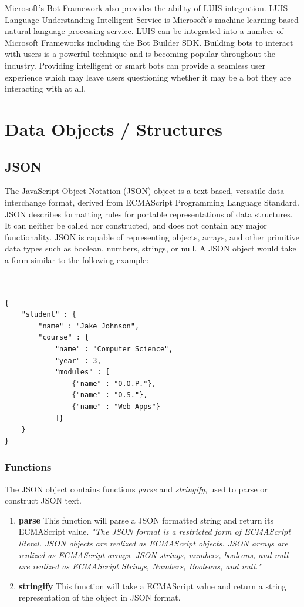 Microsoft's Bot Framework also provides the ability of LUIS\cite{LUIS} integration. LUIS - Language Understanding Intelligent Service is Microsoft's machine learning based natural language processing service. LUIS can be integrated into a number of Microsoft Frameworks including the Bot Builder SDK. Building bots to interact with users is a powerful technique and is becoming popular throughout the industry. Providing intelligent or smart bots can provide a seamless user experience which may leave users questioning whether it may be a bot they are interacting with at all.

\section{Data Objects / Structures}
\subsection{JSON}
	The JavaScript Object Notation (JSON) object is a text-based, versatile data interchange format, derived from ECMAScript Programming Language Standard. JSON describes formatting rules for portable representations of data structures\cite{crockford}. It can neither be called nor constructed, and does not contain any major functionality\cite{ecma}. JSON is capable of representing objects, arrays, and other primitive data types such as boolean, numbers, strings, or null\cite{crockford}.  A JSON object would take a form similar to the following example:
\\
\\
\\
\begin{verbatim}
{
	"student" : {
		"name" : "Jake Johnson",
		"course" : {
			"name" : "Computer Science",
			"year" : 3,
			"modules" : [ 
				{"name" : "O.O.P."},
				{"name" : "O.S."},
				{"name" : "Web Apps"} 
			]}
	}
}
\end{verbatim}
\subsubsection{Functions}
The JSON object contains functions \emph{parse} and \emph{stringify}, used to parse or construct JSON text. 
\begin{enumerate}
\item \textbf{parse} This function will parse a JSON formatted string and return its ECMAScript value. \emph{"The JSON format is a restricted form of ECMAScript literal. JSON objects are realized as ECMAScript objects. JSON arrays are realized as ECMAScript arrays. JSON strings, numbers, booleans, and null are realized as ECMAScript Strings, Numbers, Booleans, and null."\cite{crockford}}
\item \textbf{stringify} This function will take a ECMAScript value and return a string representation of the object in JSON format. \cite{crockford}
\end{enumerate}
